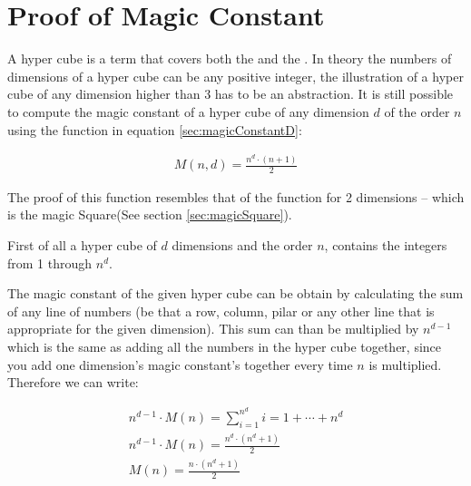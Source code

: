 \section{Proof of Magic Constant}
\label{sec:proofOfMagicConstant}
A hyper cube is a term that covers both the \msquare{} and the \mcube{}. In theory the numbers of dimensions of a hyper cube can be any positive integer, the illustration of a hyper cube of any dimension higher than 3 has to be an abstraction. It is still possible to compute the magic constant of a hyper cube of any dimension $d$ of the order $n$ using the function in equation \ref{sec:magicConstantD}:

\begin{align}
\label{sec:magicConstantD}
	M \left( n,d \right) = \frac{n^d \cdot \left( n+1 \right)}{2}
\end{align}

The proof of this function resembles that of the function for 2 dimensions -- which is the magic Square(See section \ref{sec:magicSquare}).

First of all a hyper cube of $d$ dimensions and the order $n$, contains the integers from 1 through $n^d$.

The magic constant of the given hyper cube can be obtain by calculating the sum of any line of numbers (be that a row, column, pilar or any other line that is appropriate for the given dimension). This sum can than be multiplied by $n^{d-1}$ which is the same as adding all the numbers in the hyper cube together, since you add one dimension's magic constant's together every time $n$ is multiplied. Therefore we can write:

\begin{align}
	n^{d-1} \cdot M \left( n \right) = \sum ^{n^d}_{i = 1} i = 1 + \cdots + n^d \\
	n^{d-1} \cdot M \left( n \right) = \frac{n^d \cdot \left( n^d + 1 \right)}{2} \\
	M \left( n \right) = \frac{n \cdot \left( n^d + 1 \right)}{2}
\end{align}
